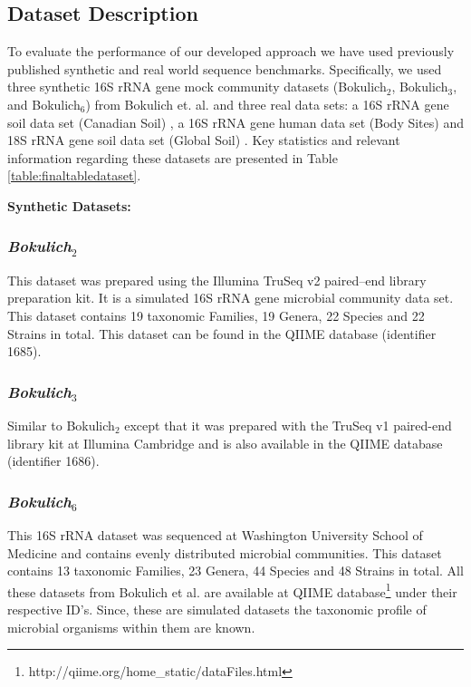 \documentclass[10pt, conference, compsocconf]{IEEEtran}
\begin{document}
\subsection{\textbf{Dataset Description}}


To evaluate the performance of our developed approach 
we have used previously published 
synthetic and real world
sequence benchmarks. 
%
Specifically, 
we used  three synthetic 16S rRNA gene mock 
community datasets (Bokulich$_2$, Bokulich$_3$, and Bokulich$_6$) 
from Bokulich et. al. \cite{MARmockDatasetRef} and 
three 
real data sets: a 16S rRNA gene soil 
data set (Canadian Soil) \cite{MARcanadianSoil}, a 16S rRNA gene 
human data set (Body Sites) \cite{MARbodySites} and 
18S rRNA gene soil data set (Global Soil) \cite{MARglobalSoil}. 
Key statistics and relevant 
information regarding these datasets are presented
in Table \ref{table:finaltabledataset}. 

\textbf{Synthetic Datasets:}

\subsubsection{\textit{Bokulich$_2$}}
This dataset was prepared using the 
Illumina TruSeq v2 paired--end library
preparation kit. It is a simulated 16S rRNA gene 
microbial community data set.
This 
dataset contains 19 taxonomic Families, 19 Genera, 22 Species 
and 22 Strains in total. This dataset can be 
found in the QIIME database (identifier 1685).

\subsubsection{\textit{Bokulich$_3$}}
Similar to Bokulich$_2$ except that it was 
prepared with the 
TruSeq v1 paired-end library kit at 
Illumina Cambridge and is  also available in the 
QIIME database (identifier 1686).

\subsubsection{\textit{Bokulich$_6$}}
This  16S rRNA dataset 
was sequenced at Washington University School of Medicine and 
contains evenly distributed microbial communities. This 
dataset contains 13 taxonomic 
Families, 23 Genera, 44 Species and 48 Strains in total.
%
All these datasets from Bokulich et al.\cite{MARmockDatasetRef} are 
available at QIIME database\footnote{http://qiime.org/home\_static/dataFiles.html} under their respective ID's. Since, these are simulated 
datasets the taxonomic profile of microbial organisms within them 
are known.
\end{document}
